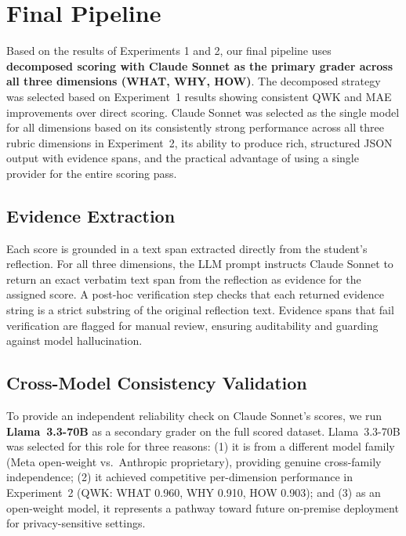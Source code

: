 \documentclass[11pt]{article}
\begin{document}
\section{Final Pipeline}
\label{sec:pipeline}

Based on the results of Experiments 1 and 2, our final pipeline uses \textbf{decomposed scoring with Claude Sonnet as the primary grader across all three dimensions (WHAT, WHY, HOW)}. The decomposed strategy was selected based on Experiment~1 results showing consistent QWK and MAE improvements over direct scoring. Claude Sonnet was selected as the single model for all dimensions based on its consistently strong performance across all three rubric dimensions in Experiment~2, its ability to produce rich, structured JSON output with evidence spans, and the practical advantage of using a single provider for the entire scoring pass.

\subsection{Evidence Extraction}

Each score is grounded in a text span extracted directly from the student's reflection. For all three dimensions, the LLM prompt instructs Claude Sonnet to return an exact verbatim text span from the reflection as evidence for the assigned score. A post-hoc verification step checks that each returned evidence string is a strict substring of the original reflection text. Evidence spans that fail verification are flagged for manual review, ensuring auditability and guarding against model hallucination.

\subsection{Cross-Model Consistency Validation}

To provide an independent reliability check on Claude Sonnet's scores, we run \textbf{Llama~3.3-70B} as a secondary grader on the full scored dataset. Llama~3.3-70B was selected for this role for three reasons: (1) it is from a different model family (Meta open-weight vs.\ Anthropic proprietary), providing genuine cross-family independence; (2) it achieved competitive per-dimension performance in Experiment~2 (QWK: WHAT 0.960, WHY 0.910, HOW 0.903); and (3) as an open-weight model, it represents a pathway toward future on-premise deployment for privacy-sensitive settings.
\end{document}

